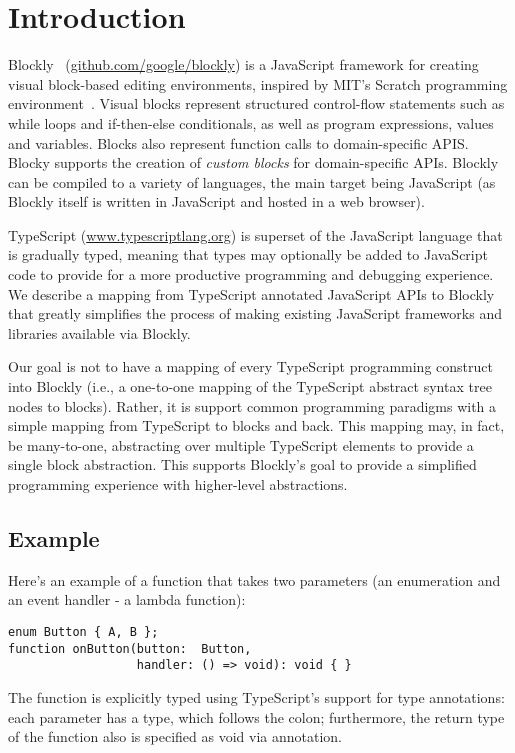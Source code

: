 \section{Introduction}

Blockly~\cite{Blocky2015} (\url{github.com/google/blockly}) 
is a JavaScript framework for creating visual block-based editing environments, 
inspired by MIT’s Scratch programming environment~\cite{ScratchCACM2009}.  Visual blocks represent structured 
control-flow statements such as while loops and if-then-else conditionals, as well as program expressions,
values and variables. 
Blocks also represent function calls to domain-specific APIS. Blocky supports the creation of \emph{custom 
blocks} for domain-specific APIs. Blockly can be compiled to a variety of languages, the main target 
being JavaScript (as Blockly itself is written in JavaScript and hosted in a web browser).

TypeScript (\url{www.typescriptlang.org}) is superset of the JavaScript language that is gradually typed, 
meaning that types may 
optionally be added to JavaScript code to provide for a more productive programming and debugging experience. 
We describe a mapping from TypeScript annotated JavaScript APIs to Blockly that greatly simplifies 
the process of making existing JavaScript frameworks and libraries available via Blockly.

Our goal is not to have a mapping of every TypeScript programming construct into Blockly 
(i.e., a one-to-one mapping of the TypeScript abstract syntax tree nodes to blocks).
Rather, it is support common programming paradigms with a simple mapping
from TypeScript to blocks and back.  This mapping may, in fact, be many-to-one, 
abstracting over multiple TypeScript elements to provide a single block abstraction.
This supports Blockly's goal to provide a simplified programming experience 
with higher-level abstractions.

\subsection{Example}

Here's an example of a function that takes two parameters (an enumeration and
an event handler - a lambda function):
\begin{lstlisting}
enum Button { A, B };
function onButton(button:  Button, 
                  handler: () => void): void { }
\end{lstlisting}
The function is explicitly typed using TypeScript's support for
type annotations: each parameter has a type, which follows the colon;
furthermore, the return type of the function also is specified as void
via annotation. 

